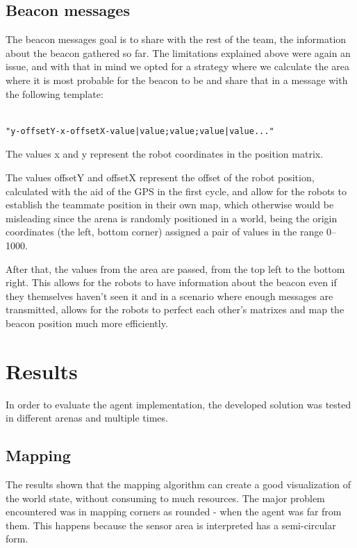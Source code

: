 \documentclass[oribibl]{llncs}
\begin{document}
\subsection{Beacon messages}

The beacon messages goal is to share with the rest of the team, the information about the beacon gathered so far. The limitations explained above were again an issue, and with that in mind we opted for a strategy where we calculate the area where it is most probable for the beacon to be and share that in a message with the following template:

\begin{verbatim}

"y-offsetY-x-offsetX-value|value;value;value|value..."

\end{verbatim}

The values x and y represent the robot coordinates in the position matrix.

The values offsetY and offsetX represent the offset of the robot position, calculated with the aid of the GPS in the first cycle, and allow for the robots to establish the teammate position in their own map, which otherwise would be misleading since the arena is randomly positioned in a world, being the origin coordinates (the left, bottom corner) assigned a pair of values in the range 0–1000.

After that, the values from the area are passed, from the top left to the bottom right.
This allows for the robots to have information about the beacon even if they themselves haven’t seen it and in a scenario where enough messages are transmitted, allows for the robots to perfect each other’s matrixes and map the beacon position much more efficiently.


\section{Results}

In order to evaluate the agent implementation, the developed solution was tested in different arenas and multiple times.

\subsection{Mapping}

The results shown that the mapping algorithm can create a good visualization of the world state, without consuming to much resources. The major problem encountered was in mapping corners as rounded - when the agent was far from them. This happens because the sensor area is interpreted has a semi-circular form. 
\end{document}
